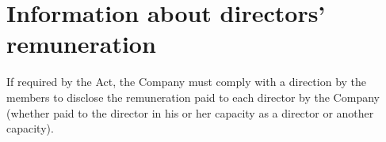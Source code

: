 \section{Information about directors' remuneration}

If required by the Act, the Company must comply with a direction by the members to disclose the remuneration paid to each director by the Company (whether paid to the director in his or her capacity as a director or another capacity). 